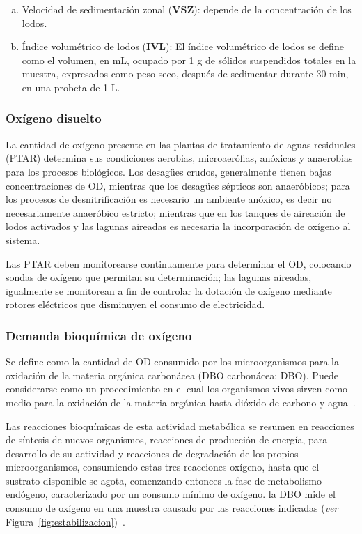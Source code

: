 \begin{small}
\begin{enumerate}[a)]
	\item Velocidad de sedimentación zonal (\textbf{VSZ}): depende de la concentración de los lodos.
	\item Índice volumétrico de lodos (\textbf{IVL}): El índice volumétrico de lodos se define como el volumen, en mL, ocupado por 1 g de sólidos suspendidos totales en la muestra, expresados como peso seco, después de sedimentar durante 30 min, en una probeta de 1 L.
\end{enumerate}
\end{small}

\subsubsection*{Oxígeno disuelto}
La cantidad de oxígeno presente en las plantas de tratamiento de aguas residuales (PTAR) determina sus condiciones aerobias, microaerófias, anóxicas y anaerobias para los procesos biológicos. Los desagües crudos, generalmente tienen bajas concentraciones de OD, mientras que los desagües sépticos son anaeróbicos; para los procesos de desnitrificación es necesario un ambiente anóxico, es decir no necesariamente anaeróbico estricto; mientras que en los tanques de aireación de lodos activados y las lagunas aireadas es necesaria la incorporación de oxígeno al sistema\citep{carreno17}.\par
Las PTAR deben monitorearse continuamente para determinar el OD, colocando sondas de oxígeno que permitan su determinación; las lagunas aireadas, igualmente se monitorean a fin de controlar la dotación de oxígeno mediante rotores eléctricos que disminuyen el consumo  de electricidad.

\subsubsection*{Demanda bioquímica de oxígeno}
Se define como la cantidad de OD consumido por los microorganismos para la oxidación de la materia orgánica carbonácea (DBO carbonácea: DBO). Puede considerarse como un procedimiento en el cual los organismos vivos sirven como medio para la oxidación de la materia orgánica hasta dióxido de carbono y agua~\citep{carreno17}.\par
Las reacciones bioquímicas de esta actividad metabólica se resumen en reacciones de síntesis de nuevos organismos, reacciones de producción de energía, para desarrollo de su actividad y reacciones de degradación de los propios microorganismos, consumiendo estas tres reacciones oxígeno, hasta que el sustrato disponible se agota, comenzando entonces la fase de metabolismo endógeno, caracterizado por un consumo mínimo de oxígeno. la DBO mide el consumo de oxígeno en una muestra causado por las reacciones indicadas (\emph{ver} Figura~\ref{fig:estabilizacion})~\citep{manuel13}.

